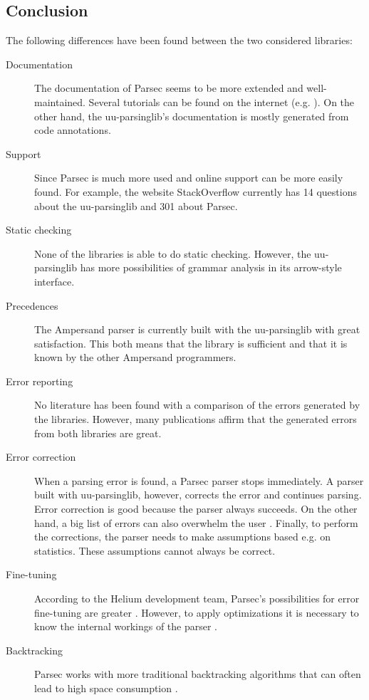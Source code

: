 \subsection{Conclusion}
The following differences have been found between the two considered libraries:
\begin{description}
	\item[Documentation] The documentation of Parsec seems to be more extended and well-maintained.
		Several tutorials can be found on the internet (e.g. \cite{using-parsec}).
		On the other hand, the uu-parsinglib's documentation is mostly generated from code annotations.
	\item[Support] Since Parsec is much more used and online support can be more easily found.
		For example, the website StackOverflow currently has 14 questions about the uu-parsinglib and 301 about Parsec.
	\item[Static checking] None of the libraries is able to do static checking.
		However, the uu-parsinglib has more possibilities of grammar analysis in its arrow-style interface.
	\item[Precedences] The Ampersand parser is currently built with the uu-parsinglib with great satisfaction.
		This both means that the library is sufficient and that it is known by the other Ampersand programmers.
	\item[Error reporting] No literature has been found with a comparison of the errors generated by the libraries.
		However, many publications affirm that the generated errors from both libraries are great.
	\item[Error correction] When a parsing error is found, a Parsec parser stops immediately.
		A parser built with uu-parsinglib, however, corrects the error and continues parsing.
		Error correction is good because the parser always succeeds.
		On the other hand, a big list of errors can also overwhelm the user \cite{heeren-error}.
		Finally, to perform the corrections, the parser needs to make assumptions based e.g. on statistics.
		These assumptions cannot always be correct.
	\item[Fine-tuning] According to the Helium development team, Parsec's possibilities for error fine-tuning are greater \cite{helium-parser}.
		However, to apply optimizations it is necessary to know the internal workings of the parser \cite{uu-doc}.
	\item[Backtracking] Parsec works with more traditional backtracking algorithms \cite{parsec} that can often lead to high space consumption \cite{uu-doc}.

\end{description}
